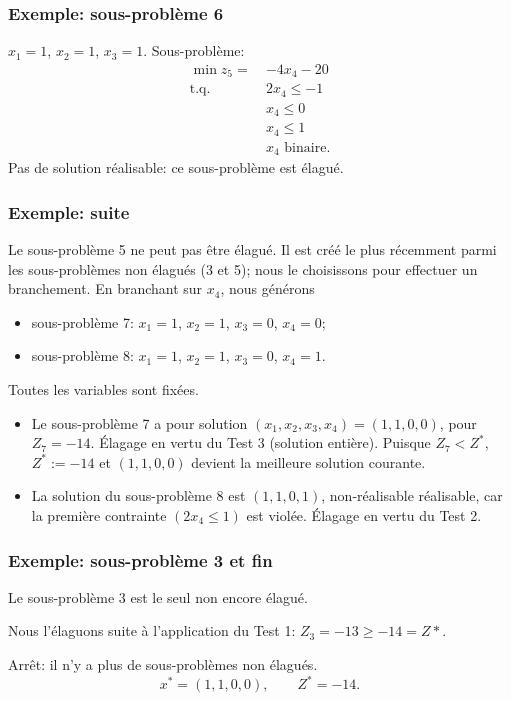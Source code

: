 \documentclass[usepdftitle=false, aspectratio=169]{beamer}
\def\st{\mbox{t.q. }}
\begin{document}
\begin{frame}
\frametitle{Exemple: sous-problème 6}

$x_1 = 1$, $x_2 = 1$, $x_3 = 1$. Sous-problème:
\begin{align*}
\min z_5 =\ & -4x_4 - 20 \\
\st{} & 2x_4 \leq -1 \\
& x_4 \leq 0 \\
& x_4 \leq 1 \\
& x_4 \mbox{ binaire}.
\end{align*}
Pas de solution réalisable: ce sous-problème est élagué.

\end{frame}

\begin{frame}
\frametitle{Exemple: suite}

Le sous-problème 5 ne peut pas être élagué.
Il est créé le plus récemment parmi les sous-problèmes non élagués (3 et 5); nous le choisissons pour effectuer un branchement.
En branchant sur $x_4$, nous générons
\begin{itemize}
\item
sous-problème 7: $x_1 = 1$, $x_2 = 1$, $x_3 = 0$, $x_4 = 0$;
\item
sous-problème 8: $x_1 = 1$, $x_2 = 1$, $x_3 = 0$, $x_4 = 1$.
\end{itemize}

\mbox{}

Toutes les variables sont fixées.
\begin{itemize}
	\item 
Le sous-problème 7 a pour solution $(x_1, x_2, x_3, x_4) = (1, 1, 0, 0)$, pour $Z_7 = -14$.
Élagage en vertu du Test 3 (solution entière).
Puisque $Z_7 < Z^*$, $Z^* := -14$ et $(1, 1, 0, 0)$ devient la meilleure solution courante.
	\item 
La solution du sous-problème 8 est $(1, 1, 0, 1)$, non-réalisable réalisable, car la première contrainte $(2x_4 \leq 1)$ est violée. Élagage en vertu du Test 2.
\end{itemize} 

\end{frame}

\begin{frame}
\frametitle{Exemple: sous-problème 3 et fin}

Le sous-problème 3 est le seul non encore élagué.

\mbox{}

Nous l'élaguons suite à l'application du Test 1: $Z_3 = -13 \geq -14 = Z*$.

\mbox{}

Arrêt: il n'y a plus de sous-problèmes non élagués.
$$
x^* = (1,1,0,0),\qquad Z^* = -14.
$$

\end{frame}
\end{document}
